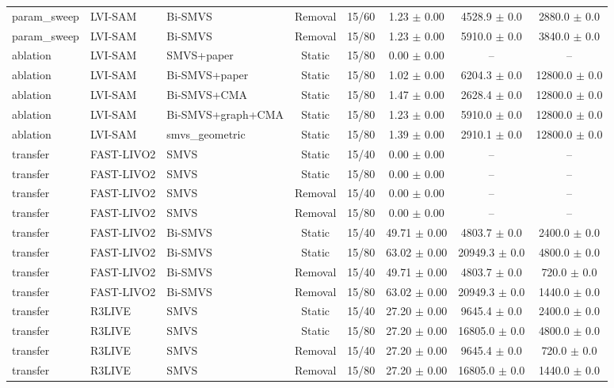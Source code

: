 \begin{table}[t]
\begin{tabular}{lllccccc}
param\_sweep & LVI-SAM & Bi-SMVS & Removal & 15/60 & 1.23 $\pm$ 0.00 & 4528.9 $\pm$ 0.0 & 2880.0 $\pm$ 0.0 \\
param\_sweep & LVI-SAM & Bi-SMVS & Removal & 15/80 & 1.23 $\pm$ 0.00 & 5910.0 $\pm$ 0.0 & 3840.0 $\pm$ 0.0 \\
ablation & LVI-SAM & SMVS+paper & Static & 15/80 & 0.00 $\pm$ 0.00 & -- & -- \\
ablation & LVI-SAM & Bi-SMVS+paper & Static & 15/80 & 1.02 $\pm$ 0.00 & 6204.3 $\pm$ 0.0 & 12800.0 $\pm$ 0.0 \\
ablation & LVI-SAM & Bi-SMVS+CMA & Static & 15/80 & 1.47 $\pm$ 0.00 & 2628.4 $\pm$ 0.0 & 12800.0 $\pm$ 0.0 \\
ablation & LVI-SAM & Bi-SMVS+graph+CMA & Static & 15/80 & 1.23 $\pm$ 0.00 & 5910.0 $\pm$ 0.0 & 12800.0 $\pm$ 0.0 \\
ablation & LVI-SAM & smvs_geometric & Static & 15/80 & 1.39 $\pm$ 0.00 & 2910.1 $\pm$ 0.0 & 12800.0 $\pm$ 0.0 \\
transfer & FAST-LIVO2 & SMVS & Static & 15/40 & 0.00 $\pm$ 0.00 & -- & -- \\
transfer & FAST-LIVO2 & SMVS & Static & 15/80 & 0.00 $\pm$ 0.00 & -- & -- \\
transfer & FAST-LIVO2 & SMVS & Removal & 15/40 & 0.00 $\pm$ 0.00 & -- & -- \\
transfer & FAST-LIVO2 & SMVS & Removal & 15/80 & 0.00 $\pm$ 0.00 & -- & -- \\
transfer & FAST-LIVO2 & Bi-SMVS & Static & 15/40 & 49.71 $\pm$ 0.00 & 4803.7 $\pm$ 0.0 & 2400.0 $\pm$ 0.0 \\
transfer & FAST-LIVO2 & Bi-SMVS & Static & 15/80 & 63.02 $\pm$ 0.00 & 20949.3 $\pm$ 0.0 & 4800.0 $\pm$ 0.0 \\
transfer & FAST-LIVO2 & Bi-SMVS & Removal & 15/40 & 49.71 $\pm$ 0.00 & 4803.7 $\pm$ 0.0 & 720.0 $\pm$ 0.0 \\
transfer & FAST-LIVO2 & Bi-SMVS & Removal & 15/80 & 63.02 $\pm$ 0.00 & 20949.3 $\pm$ 0.0 & 1440.0 $\pm$ 0.0 \\
transfer & R3LIVE & SMVS & Static & 15/40 & 27.20 $\pm$ 0.00 & 9645.4 $\pm$ 0.0 & 2400.0 $\pm$ 0.0 \\
transfer & R3LIVE & SMVS & Static & 15/80 & 27.20 $\pm$ 0.00 & 16805.0 $\pm$ 0.0 & 4800.0 $\pm$ 0.0 \\
transfer & R3LIVE & SMVS & Removal & 15/40 & 27.20 $\pm$ 0.00 & 9645.4 $\pm$ 0.0 & 720.0 $\pm$ 0.0 \\
transfer & R3LIVE & SMVS & Removal & 15/80 & 27.20 $\pm$ 0.00 & 16805.0 $\pm$ 0.0 & 1440.0 $\pm$ 0.0 \\

\end{tabular}
\end{table}
